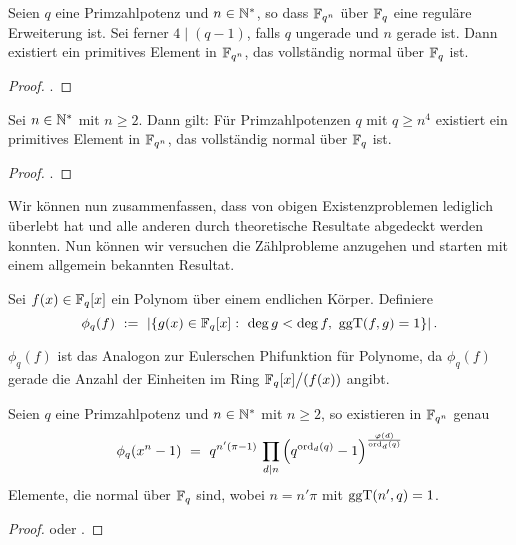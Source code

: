 \begin{satz}
  \label{satz:pcn_in_regular}
  Seien $q$ eine Primzahlpotenz und $n \in \mathbb{N}^\ast$, so dass
  $\mathbb{F}_{q^n}$ über $\mathbb{F}_q$ eine reguläre Erweiterung ist. Sei ferner
  $4\mid (q-1)$, falls $q$ ungerade und $n$ gerade ist. Dann existiert ein
  primitives Element in $\mathbb{F}_{q^n}$, das vollständig normal über $\mathbb{F}_q$ ist.
\end{satz}
\begin{proof}
  \autocite[Theorem 1.4]{hachenberger2001}.
\end{proof}


\begin{satz}
  \label{satz:pcn_schranke}
  Sei $n\in \mathbb{N}^\ast$ mit $n\geq 2$. Dann gilt:
  Für Primzahlpotenzen $q$ mit $q \geq n^4$ existiert ein primitives Element in 
  $\mathbb{F}_{q^n}$, das vollständig normal über $\mathbb{F}_q$ ist.
\end{satz}
\begin{proof}
  \autocite[Theorem 2]{hachenberger2014}.
\end{proof}

Wir können nun zusammenfassen, dass von obigen Existenzproblemen lediglich
 überlebt hat und alle anderen durch theoretische Resultate
abgedeckt werden konnten. Nun können wir versuchen die Zählprobleme anzugehen
und starten mit einem allgemein bekannten Resultat.

\begin{definition}
  Sei $f(x) \in \mathbb{F}_q[x]$ ein Polynom über einem endlichen Körper. Definiere
  \[ \phi_q(f) \speq{:=} |\{ g(x) \in \F_q[x]:\ 
    \deg g < \deg f,\ \ggT(f,g) = 1\}|\,.\]
\end{definition}

\begin{bemerkung}
  $\phi_q(f)$ ist das Analogon zur Eulerschen Phifunktion für Polynome, da
   $\phi_q(f)$ gerade die Anzahl der Einheiten im Ring $\mathbb{F}_q[x]\big/(f(x))$
   angibt.
\end{bemerkung}

\begin{satz}
  \label{satz:anzahl_normal}
  Seien $q$ eine Primzahlpotenz und $n\in \mathbb{N}^\ast$ mit $n\geq 2$, so existieren
  in $\mathbb{F}_{q^n}$ genau 
  \[ \phi_q(x^n-1) \ =\  q^{n'(\pi-1)}\,\prod_{d\mid n}
    \left( q^{\operatorname{ord}_d(q)} -1 \right)^{\frac{\varphi(d)}{\operatorname{ord}_d(q)}}\]
  Elemente, die normal über $\mathbb{F}_q$ sind, wobei $n = n'\pi$ mit $\operatorname{ggT}(n',q) = 1$.
\end{satz}
\begin{proof}
  \autocite[Theorem 3.73]{lidl1997finite} oder 
  \autocite[Theorem 10.5]{hachenberger1997finite}.
\end{proof}

